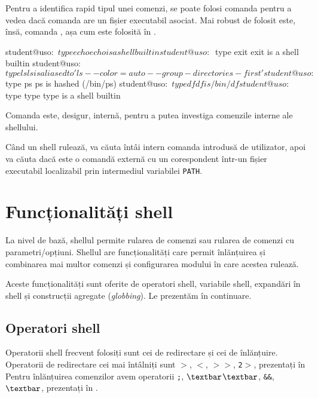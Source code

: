 Pentru a identifica rapid tipul unei comenzi, se poate folosi comanda 
pentru a vedea dacă comanda are un fișier executabil asociat. Mai robust de
folosit este, însă, comanda , așa cum este folosită în .

\begin{screen}[caption={Tipul unei comenzi (type)},label={lst:cli:type}]
student@uso:~$ type echo
echo is a shell builtin
student@uso:~$ type exit
exit is a shell builtin
student@uso:~$ type ls
ls is aliased to 'ls --color=auto --group-directories-first'
student@uso:~$ type ps
ps is hashed (/bin/ps)
student@uso:~$ type df
df is /bin/df
student@uso:~$ type type
type is a shell builtin
\end{screen}

Comanda  este, desigur, internă, pentru a putea investiga comenzile interne
ale shellului.

Când un shell rulează, va căuta întâi intern comanda introdusă de utilizator,
apoi va căuta dacă este o comandă externă cu un corespondent într-un fișier
executabil localizabil prin intermediul variabilei \texttt{PATH}.

\section{Funcționalități shell}
\label{sec:cli:shell-func}

La nivel de bază, shellul permite rularea de comenzi sau rularea de comenzi cu
parametri/opțiuni. Shellul are funcționalități care permit înlănțuirea și
combinarea mai multor comenzi și configurarea modului în care acestea rulează.

Aceste funcționalități sunt oferite de operatori shell, variabile shell,
expandări în shell și construcții agregate (\textit{globbing}). Le prezentăm în
continuare.

\subsection{Operatori shell}
\label{sec:cli:shell-func:operators}

Operatorii shell frecvent folosiți sunt cei de redirectare și cei de înlănțuire.
Operatorii de redirectare cei mai întâlniți sunt \texttt{$>$}, \texttt{$<$}, \texttt{$>$$>$}, \texttt{2$>$}, prezentați în  
Pentru înlănțuirea comenzilor avem operatorii \texttt{;}, \texttt{$\textbar$$\textbar$}, \texttt{\&\&}, \texttt{$\textbar$}, prezentați în .

